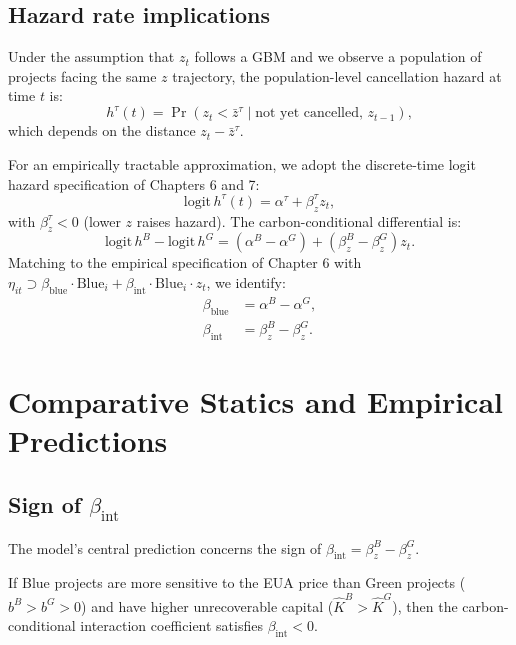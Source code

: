 \documentclass[11pt,a4paper]{article}
\newcommand{\bint}{\beta_{\mathrm{int}}}
\newcommand{\bblue}{\beta_{\mathrm{blue}}}
\begin{document}
\subsection{Hazard rate implications}

Under the assumption that $z_t$ follows a GBM and we observe a population of projects facing the same $z$ trajectory, the population-level cancellation hazard at time $t$ is:
\begin{equation}
h^{\tau}(t) = \Pr(z_t < \bar{z}^{\tau} \mid \text{not yet cancelled, } z_{t-1}),
\end{equation}
which depends on the distance $z_t - \bar{z}^{\tau}$.

For an empirically tractable approximation, we adopt the discrete-time logit hazard specification of Chapters 6 and 7:
\begin{equation}
\mathrm{logit}\, h^{\tau}(t) = \alpha^{\tau} + \beta_z^{\tau} z_t,
\end{equation}
with $\beta_z^{\tau} < 0$ (lower $z$ raises hazard). The carbon-conditional differential is:
\begin{equation}
\mathrm{logit}\, h^B - \mathrm{logit}\, h^G = (\alpha^B - \alpha^G) + (\beta_z^B - \beta_z^G) z_t.
\end{equation}
Matching to the empirical specification of Chapter 6 with $\eta_{it} \supset \bblue \cdot \mathrm{Blue}_i + \bint \cdot \mathrm{Blue}_i \cdot z_t$, we identify:
\begin{align}
\bblue &= \alpha^B - \alpha^G, \\
\bint &= \beta_z^B - \beta_z^G.
\end{align}

\section{Comparative Statics and Empirical Predictions}
\label{sec:ch3-comparative}

\subsection{Sign of $\bint$}

The model's central prediction concerns the sign of $\bint = \beta_z^B - \beta_z^G$.

\begin{proposition}
\label{prop:ch3-sign}
If Blue projects are more sensitive to the EUA price than Green projects ($b^B > b^G > 0$) and have higher unrecoverable capital ($\hat{K}^B > \hat{K}^G$), then the carbon-conditional interaction coefficient satisfies $\bint < 0$.
\end{proposition}
\end{document}
